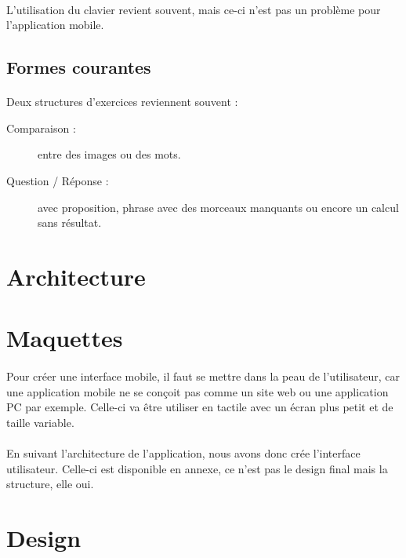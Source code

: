 \documentclass[french]{report}
\begin{document}
\paragraph{}L'utilisation du clavier revient souvent, mais ce-ci n'est pas un problème pour l'application mobile.

\subsection{Formes courantes}
\paragraph{}Deux structures d'exercices reviennent souvent :
\begin{description}
\item[Comparaison : ] entre des images ou des mots.
\item[Question / Réponse : ] avec proposition, phrase avec des morceaux manquants ou encore un calcul sans résultat.
\end{description}
\section{Architecture}
\section{Maquettes}
\paragraph{}Pour créer une interface mobile, il faut se mettre dans la peau de l'utilisateur, car une application mobile ne se conçoit pas comme un site web ou une application PC par exemple. Celle-ci va être utiliser en tactile avec un écran plus petit et de taille variable.

\paragraph{}En suivant l'architecture de l'application, nous avons donc crée l'interface utilisateur. Celle-ci est disponible en annexe, ce n'est pas le design final mais la structure, elle oui.

\section{Design}
\end{document}
